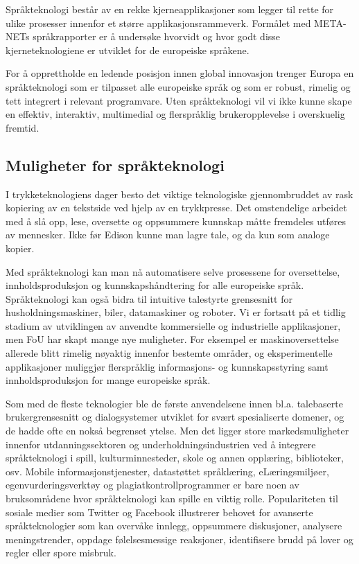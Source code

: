\begin{multicols}{2}
Språkteknologi består av en rekke kjerneapplikasjoner som legger til rette for ulike prosesser innenfor et større applikasjonsrammeverk. Formålet med META-NETs språkrapporter er å undersøke hvorvidt og hvor godt disse kjerneteknologiene er utviklet for de europeiske språkene.


For å opprettholde en ledende posisjon innen global innovasjon trenger Europa en språkteknologi som er tilpasset alle europeiske språk og som er robust, rimelig og tett integrert i relevant programvare. Uten språkteknologi vil vi ikke kunne skape en effektiv, interaktiv, multimedial og flerspråklig brukeropplevelse i overskuelig fremtid.

\subsection{Muligheter for språkteknologi}

I trykketeknologiens dager besto det viktige teknologiske gjennombruddet av rask kopiering av en tekstside ved hjelp av en trykkpresse. Det omstendelige arbeidet med å slå opp, lese, oversette og oppsummere kunnskap måtte fremdeles utføres av mennesker. Ikke før Edison kunne man lagre tale, og da kun som analoge kopier.

Med språkteknologi kan man nå automatisere selve prosessene for oversettelse, innholdsproduksjon og kunnskapshåndtering for alle europeiske språk. Språkteknologi kan også bidra til intuitive talestyrte grensesnitt for husholdningsmaskiner, biler, datamaskiner og roboter. Vi er fortsatt på et tidlig stadium av utviklingen av anvendte kommersielle og industrielle applikasjoner, men FoU har skapt mange nye muligheter. For eksempel er maskinoversettelse allerede blitt rimelig nøyaktig innenfor bestemte områder,  og eksperimentelle applikasjoner muliggjør flerspråklig informasjons- og kunnskapsstyring samt innholdsproduksjon for mange europeiske språk.

Som med de fleste teknologier ble de første anvendelsene innen bl.a. talebaserte brukergrensesnitt og dialogsystemer utviklet for svært spesialiserte domener, og de hadde ofte en nokså begrenset ytelse. Men det ligger store markedsmuligheter innenfor utdanningssektoren og underholdningsindustrien ved å integrere språkteknologi i spill, kulturminnesteder, skole og annen opplæring, biblioteker, osv. Mobile informasjonstjenester, datastøttet språklæring, eLæringsmiljøer, egenvurderingsverktøy og plagiatkontrollprogrammer er bare noen av bruksområdene hvor språkteknologi kan spille en viktig rolle. Populariteten til sosiale medier som Twitter og Facebook illustrerer behovet for avanserte språkteknologier som kan overvåke innlegg, oppsummere diskusjoner, analysere meningstrender, oppdage følelsesmessige  reaksjoner, identifisere brudd på lover og regler eller spore misbruk.


\end{multicols}
